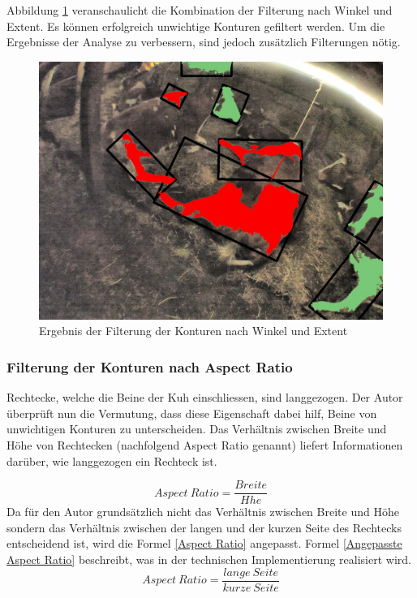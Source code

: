 Abbildung \ref{fig: Ergebnis der Filterung der Konturen nach Winkel und Extent } veranschaulicht die Kombination der Filterung nach Winkel und Extent. Es können erfolgreich unwichtige Konturen gefiltert werden. Um die Ergebnisse der Analyse zu verbessern, sind jedoch zusätzlich Filterungen nötig.
\begin{figure}[H]
	\center
	\includegraphics[scale=0.43]{Grafiken/entwicklung/24FilteringExtentAngle.jpg}
	\caption{Ergebnis der Filterung der Konturen nach Winkel und Extent  } 
	\label{fig: Ergebnis der Filterung der Konturen nach Winkel und Extent } 
\end{figure}

\subsubsection{Filterung der Konturen nach Aspect Ratio}

Rechtecke, welche die Beine der Kuh einschliessen, sind langgezogen. Der Autor überprüft nun die Vermutung, dass diese Eigenschaft dabei hilf, Beine von unwichtigen Konturen zu unterscheiden. Das Verhältnis zwischen Breite und Höhe von Rechtecken (nachfolgend Aspect Ratio genannt) liefert Informationen darüber, wie langgezogen ein Rechteck ist.	
	
\begin{equation}\label{Aspect Ratio}
Aspect\ Ratio =  \frac{Breite}{H\ddot{}he}  
\end{equation}
Da für den Autor grundsätzlich nicht das Verhältnis zwischen Breite und Höhe sondern das Verhältnis zwischen der langen und der kurzen Seite des Rechtecks entscheidend ist, wird die Formel \ref{Aspect Ratio} angepasst. Formel \ref{Angepasste Aspect Ratio} beschreibt, was in der technischen Implementierung realisiert wird.
\begin{equation}\label{Angepasste Aspect Ratio}
Aspect\ Ratio =  \frac{lange \ Seite}{kurze \ Seite}  
\end{equation}

